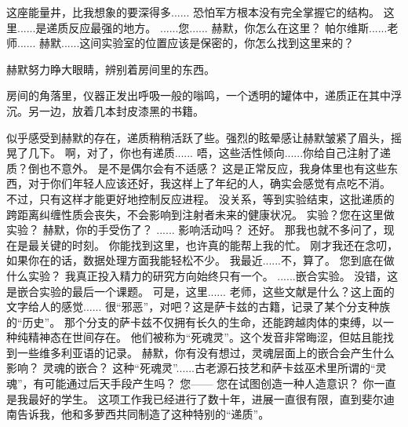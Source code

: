 \documentclass[openany]{book}
\begin{document}
\begin{dialogue}
     这座能量井，比我想象的要深得多......
     恐怕军方根本没有完全掌握它的结构。
     这里......是递质反应最强的地方。
     ......您......
     赫默，你怎么在这里？
     帕尔维斯......老师......
     赫默......这间实验室的位置应该是保密的，你怎么找到这里来的？\par
    赫默努力睁大眼睛，辨别着房间里的东西。\par
    房间的角落里，仪器正发出呼吸一般的嗡鸣，一个透明的罐体中，递质正在其中浮沉。另一边，放着几本封皮漆黑的书籍。\par
    似乎感受到赫默的存在，递质稍稍活跃了些。强烈的眩晕感让赫默皱紧了眉头，摇晃了几下。
     啊，对了，你也有递质......
     唔，这些活性倾向......你给自己注射了递质？倒也不意外。
     是不是偶尔会有不适感？
     这是正常反应，我身体里也有这些东西，对于你们年轻人应该还好，我这样上了年纪的人，确实会感觉有点吃不消。
     不过，只有这样才能更好地控制反应进程。
     没关系，等到实验结束，这批递质的跨距离纠缠性质会丧失，不会影响到注射者未来的健康状况。
     实验？您在这里做实验？
     赫默，你的手受伤了？
     ......
     影响活动吗？
     还好。
     那我也就不多问了，现在是最关键的时刻。
     你能找到这里，也许真的能帮上我的忙。
     刚才我还在念叨，如果你在的话，数据处理方面我能轻松不少。
     我最近......不，算了。
     您到底在做什么实验？
     我真正投入精力的研究方向始终只有一个。
     ......嵌合实验。
     没错，这是嵌合实验的最后一个课题。
     可是，这里......
     老师，这些文献是什么？这上面的文字给人的感觉......
     很“邪恶”，对吧？这是萨卡兹的古籍，记录了某个分支种族的“历史”。
     那个分支的萨卡兹不仅拥有长久的生命，还能跨越肉体的束缚，以一种纯精神态在世间存在。
     他们被称为“死魂灵”。这个发音非常晦涩，但姑且能找到一些维多利亚语的记录。
     赫默，你有没有想过，灵魂层面上的嵌合会产生什么影响？
     灵魂的嵌合？
     这种“死魂灵”......古老源石技艺和萨卡兹巫术里所谓的“灵魂”，有可能通过后天手段产生吗？
     您——
     您在试图创造一种人造意识？
     你一直是我最好的学生。
     这项工作我已经进行了数十年，进展一直很有限，直到斐尔迪南告诉我，他和多萝西共同制造了这种特别的“递质”。

\end{dialogue}
\end{document}
